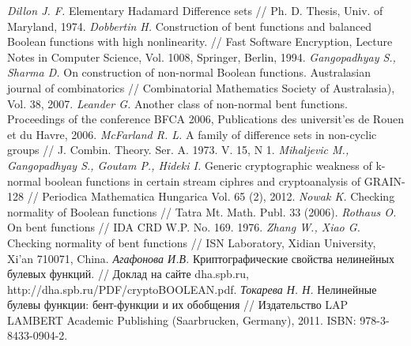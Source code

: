 \begin{thebibliography}{99}
 {\it Dillon J. F.} Elementary Hadamard Difference sets // Ph. D. Thesis, Univ. of Maryland, 1974.
 {\it Dobbertin H.} Construction of bent functions and balanced Boolean functions with high nonlinearity. // Fast Software Encryption, Lecture Notes in Computer Science, Vol. 1008, Springer, Berlin, 1994.
 {\it Gangopadhyay S., Sharma D.} On construction of non-normal Boolean functions. Australasian journal of combinatorics // Combinatorial Mathematics Society of Australasia), Vol. 38, 2007.
 {\it Leander G.} Another class of non-normal bent functions. Proceedings of the conference BFCA 2006, Publications des universit'es de Rouen et du Havre, 2006.
 {\it McFarland R. L.} A family of difference sets in non-cyclic groups // J. Combin. Theory. Ser. A. 1973. V. 15, N 1.
 {\it Mihaljevic M., Gangopadhyay S., Goutam P., Hideki I.} Generic cryptographic weakness of k-normal boolean functions in certain stream ciphres and cryptoanalysis of GRAIN-128 // Periodica Mathematica Hungarica Vol. 65 (2), 2012.
 {\it Nowak K.} Checking normality of Boolean functions // Tatra Mt. Math. Publ. 33 (2006).
 {\it Rothaus O.} On bent functions // IDA CRD W.P. No. 169. 1976.
 {\it Zhang W., Xiao G.} Checking normality of bent functions // ISN Laboratory, Xidian University, Xi’an 710071, China.
 {\it Агафонова И.В.} Криптографические свойства нелинейных булевых функций. // Доклад на сайте dha.spb.ru, http://dha.spb.ru/PDF/cryptoBOOLEAN.pdf.
 {\it Токарева Н. Н.} Нелинейные булевы функции: бент-функции и их обобщения // Издательство LAP LAMBERT Academic Publishing (Saarbrucken, Germany), 2011. ISBN: 978-3-8433-0904-2.

\end{thebibliography}
